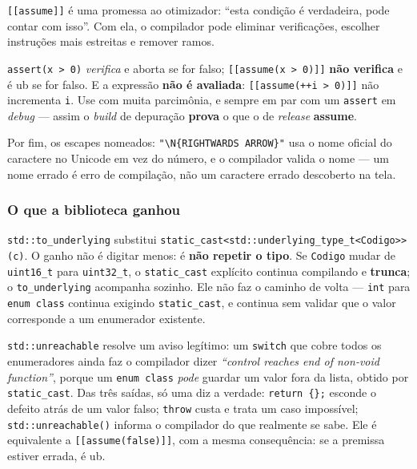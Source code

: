\texttt{[[assume]]} é uma promessa ao otimizador: ``esta condição é verdadeira,
pode contar com isso''. Com ela, o compilador pode eliminar verificações,
escolher instruções mais estreitas e remover ramos.

\begin{armadilha}
\texttt{assert(x > 0)} \emph{verifica} e aborta se for falso;
\texttt{[[assume(x > 0)]]} \textbf{não verifica} e é \gls{ub} se for falso. E a
expressão \textbf{não é avaliada}: \texttt{[[assume(++i > 0)]]} não incrementa
\texttt{i}. Use com muita parcimônia, e sempre em par com um \texttt{assert} em
\emph{debug} --- assim o \emph{build} de depuração \textbf{prova} o que o de
\emph{release} \textbf{assume}.
\end{armadilha}

Por fim, os escapes nomeados:
\texttt{"\textbackslash N\{RIGHTWARDS ARROW\}"} usa o nome oficial do caractere
no Unicode em vez do número, e o compilador valida o nome --- um nome errado é
erro de compilação, não um caractere errado descoberto na tela.

\subsubsection{O que a biblioteca ganhou}

\texttt{std::to\_underlying} substitui
\texttt{static\_cast<std::underlying\_type\_t<Codigo>>(c)}. O ganho não é
digitar menos: é \textbf{não repetir o tipo}. Se \texttt{Codigo} mudar de
\texttt{uint16\_t} para \texttt{uint32\_t}, o \texttt{static\_cast} explícito
continua compilando e \textbf{trunca}; o \texttt{to\_underlying} acompanha
sozinho. Ele não faz o caminho de volta --- \texttt{int} para \texttt{enum
class} continua exigindo \texttt{static\_cast}, e continua sem validar que o
valor corresponde a um enumerador existente.

\texttt{std::unreachable} resolve um aviso legítimo: um \texttt{switch} que
cobre todos os enumeradores ainda faz o compilador dizer \emph{``control reaches
end of non-void function''}, porque um \texttt{enum class} \emph{pode} guardar
um valor fora da lista, obtido por \texttt{static\_cast}. Das três saídas, só
uma diz a verdade: \texttt{return \{\};} esconde o defeito atrás de um valor
falso; \texttt{throw} custa e trata um caso impossível;
\texttt{std::unreachable()} informa o compilador do que realmente se sabe. Ele é
equivalente a \texttt{[[assume(false)]]}, com a mesma consequência: se a
premissa estiver errada, é \gls{ub}.

